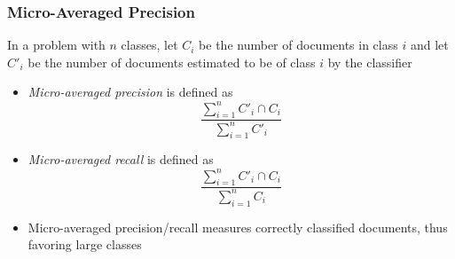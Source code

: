 \documentclass[svgnames]{beamer}
\begin{document}


\begin{frame} \frametitle{Micro-Averaged Precision}
  
 In a problem with $n$ classes, let $C_i$ be the number of documents in class
 $i$ and let $C'_i$ be the number of documents estimated to be of class $i$ by
 the classifier
 \begin{itemize}
 \item \emph{Micro-averaged precision} is defined as
   \begin{displaymath}
     \frac{\sum_{i=1}^n C'_i \cap C_i}{\sum_{i=1}^n C'_i}
   \end{displaymath}
 \item \emph{Micro-averaged recall} is defined as
   \begin{displaymath}
     \frac{\sum_{i=1}^n C'_i \cap C_i}{\sum_{i=1}^n C_i}
   \end{displaymath}
 \end{itemize}

 \begin{itemize}
 \item Micro-averaged precision/recall measures correctly classified
   documents, thus favoring large classes
 \end{itemize}
\end{frame}
\end{document}
